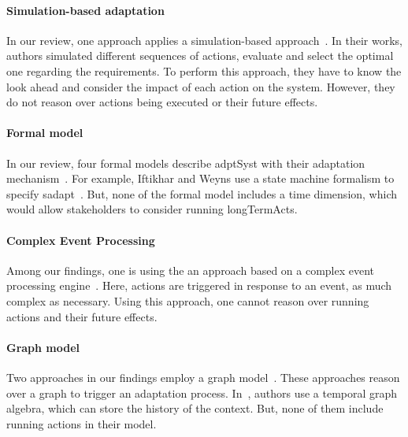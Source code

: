 \paragraph{Simulation-based adaptation}
In our review, one approach applies a simulation-based approach~\cite{DBLP:conf/smartgridsec/0001FKNT14}.
In their works, authors simulated different sequences of \glspl{action}, evaluate and select the optimal one regarding the requirements.
To perform this approach, they have to know the look ahead and consider the impact of each action on the system.
However, they do not reason over \glspl{action} being executed or their future effects.
	
\paragraph{Formal model}
In our review, four formal models describe \gls{adptSyst} with their adaptation mechanism~\cite{DBLP:journals/taas/WeynsMA12, DBLP:conf/icse/IftikharW14a, DBLP:journals/taas/WeynsHH10, DBLP:conf/icse/BartelsK11}.
For example, Iftikhar and Weyns use a state machine formalism to specify \gls{sadapt}~\cite{DBLP:conf/icse/IftikharW14a}.
But, none of the formal model includes a time dimension, which would allow stakeholders to consider running \glspl{longTermAct}.

\paragraph{Complex Event Processing}
Among our findings, one is using the an approach based on a complex event processing engine~\cite{DBLP:conf/rr/AnicicFRSSS10}.
Here, \glspl{action} are triggered in response to an event, as much complex as necessary.
Using this approach, one cannot reason over running \glspl{action} and their future effects.

\paragraph{Graph model}
Two approaches in our findings employ a graph model~\cite{DBLP:journals/tse/KramerM90, DBLP:conf/dbpl/MoffittS17}.
These approaches reason over a graph to trigger an adaptation process.
In~\cite{DBLP:conf/dbpl/MoffittS17}, authors use a temporal graph algebra, which can store the history of the context.
But, none of them include running \glspl{action} in their model.
	
